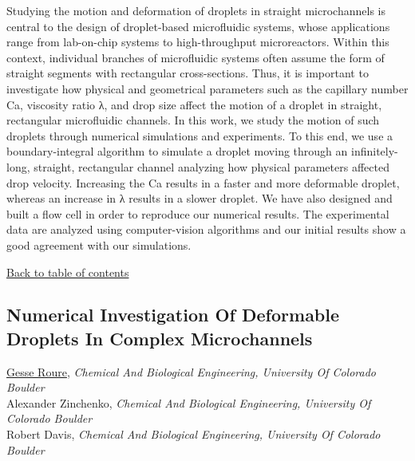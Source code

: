 \noindent Studying the motion and deformation of droplets in straight microchannels is central to the design of droplet-based microfluidic systems, whose applications range from lab-on-chip systems to high-throughput microreactors. Within this context, individual branches of microfluidic systems often assume the form of straight segments with rectangular cross-sections. Thus, it is important to investigate how physical and geometrical parameters such as the capillary number Ca, viscosity ratio λ, and drop size affect the motion of a droplet in straight, rectangular microfluidic channels. In this work, we study the motion of such droplets through numerical simulations and experiments. To this end, we use a boundary-integral algorithm to simulate a droplet moving through an infinitely-long, straight, rectangular channel analyzing how physical parameters affected drop velocity. Increasing the Ca results in a faster and more deformable droplet, whereas an increase in λ results in a slower droplet. We have also designed and built a flow cell in order to reproduce our numerical results. The experimental data are analyzed using computer-vision algorithms and our initial results show a good agreement with our simulations. \\ 
\begin{flushright}\vspace{-0.2 in}\hyperlink{toc}{Back to table of contents}\end{flushright}\vspace{-0.2 in}
\hypertarget{GesseRoure}{\subsection*{\color{CUGOLD} Numerical Investigation Of Deformable Droplets In Complex Microchannels}} \vsp 
\underline{Gesse Roure}, \textit{Chemical And Biological Engineering, University Of Colorado Boulder}\\ 
{Alexander Zinchenko}, \textit{Chemical And Biological Engineering, University Of Colorado Boulder}\\ 
{Robert Davis}, \textit{Chemical And Biological Engineering, University Of Colorado Boulder}\\ 
\vspace{-0.1 in} \\ 
